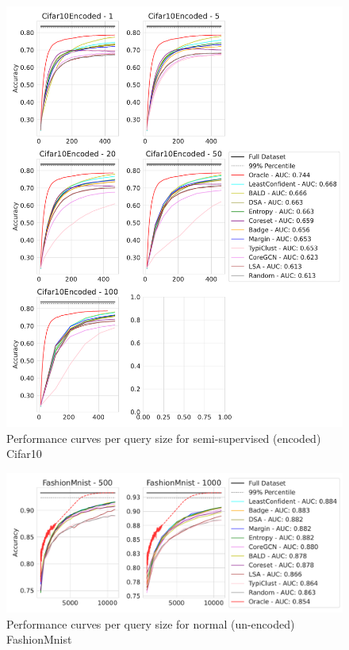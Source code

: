 \documentclass[]{article}
\begin{document}
\begin{figure}[H]
\centering
\caption{Performance curves per query size for semi-supervised (encoded) Cifar10}
\includegraphics[width=\linewidth]{img/eval_cifar10_enc}
\end{figure}
\begin{figure}[H]
    \centering
    \caption{Performance curves per query size for normal (un-encoded) FashionMnist}
    \includegraphics[width=\linewidth]{img/eval_fmnist}
\end{figure}
\end{document}
